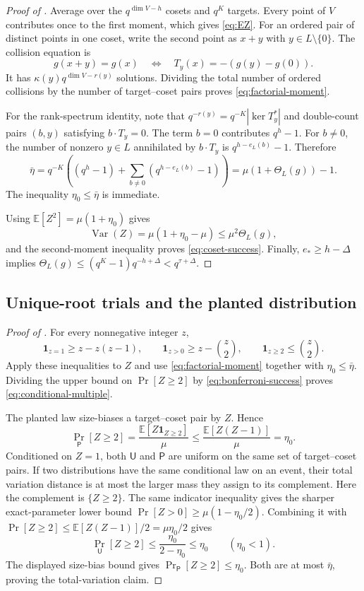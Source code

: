 \documentclass[11pt]{article}
\begin{document}
\begin{proof}[Proof of ]
Average over the $q^{\dim V-h}$ cosets and $q^K$ targets.  Every point of $V$
contributes once to the first moment, which gives \eqref{eq:EZ}.  For an
ordered pair of distinct points in one coset, write the second point as $x+y$
with $y\in L\setminus\{0\}$.  The collision equation is
\[
 g(x+y)=g(x)
 \quad\Longleftrightarrow\quad
 T_y(x)=-(g(y)-g(0)).
\]
It has $\kappa(y)q^{\dim V-r(y)}$ solutions.  Dividing the total number of
ordered collisions by the number of target--coset pairs proves
\eqref{eq:factorial-moment}.

For the rank-spectrum identity, note that
$q^{-r(y)}=q^{-K}|\ker T_y^*|$ and double-count pairs $(b,y)$ satisfying
$b\cdot T_y=0$.  The term $b=0$ contributes $q^h-1$.  For $b\ne0$, the number
of nonzero $y\in L$ annihilated by $b\cdot T_y$ is
$q^{h-e_L(b)}-1$.  Therefore
\[
 \bar\eta
 =q^{-K}\left((q^h-1)+\sum_{b\ne0}(q^{h-e_L(b)}-1)\right)
 =\mu(1+\Theta_L(g))-1.
\]
The inequality $\eta_0\le\bar\eta$ is immediate.

Using $\mathbb E[Z^2]=\mu(1+\eta_0)$ gives
\[
 \operatorname{Var}(Z)
 =\mu(1+\eta_0-\mu)
 \le\mu^2\Theta_L(g),
\]
and the second-moment inequality proves \eqref{eq:coset-success}.  Finally,
$e_*\ge h-\Delta$ implies
$\Theta_L(g)\le(q^K-1)q^{-h+\Delta}<q^{\tau+\Delta}$.
\end{proof}

\subsection{Unique-root trials and the planted distribution}\label{app:proof-singleton-coset}

\begin{proof}[Proof of ]
For every nonnegative integer $z$,
\[
 \mathbf 1_{z=1}\ge z-z(z-1),\qquad
 \mathbf 1_{z>0}\ge z-\binom z2,\qquad
 \mathbf 1_{z\ge2}\le\binom z2.
\]
Apply these inequalities to $Z$ and use
\eqref{eq:factorial-moment} together with $\eta_0\le\bar\eta$.
Dividing the upper bound on $\Pr[Z\ge2]$ by
\eqref{eq:bonferroni-success} proves \eqref{eq:conditional-multiple}.

The planted law size-biases a target--coset pair by $Z$.  Hence
\[
 \Pr_{\mathsf P}[Z\ge2]
 =\frac{\mathbb E[Z\mathbf 1_{Z\ge2}]}{\mu}
 \le\frac{\mathbb E[Z(Z-1)]}{\mu}=\eta_0.
\]
Conditioned on $Z=1$, both $\mathsf U$ and $\mathsf P$ are uniform on the same
set of target--coset pairs.  If two distributions have the same conditional
law on an event, their total variation distance is at most the larger mass they
assign to its complement.  Here the complement is $\{Z\ge2\}$.  The same indicator inequality gives the sharper exact-parameter lower bound
$\Pr[Z>0]\ge\mu(1-\eta_0/2)$.  Combining it with
$\Pr[Z\ge2]\le\mathbb E[Z(Z-1)]/2=\mu\eta_0/2$ gives
\[
 \Pr_{\mathsf U}[Z\ge2]
 \le \frac{\eta_0}{2-\eta_0}\le\eta_0
 \qquad(\eta_0<1).
\]
The displayed size-bias bound gives
$\Pr_{\mathsf P}[Z\ge2]\le\eta_0$.  Both are at most $\bar\eta$, proving the
total-variation claim.
\end{proof}
\end{document}
